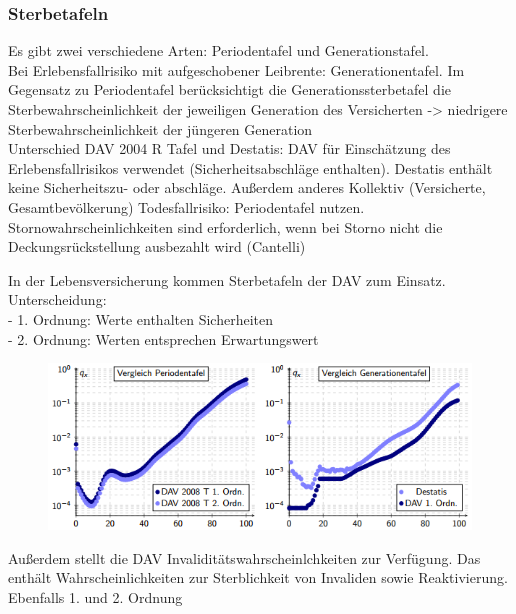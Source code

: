 \documentclass[12pt]{report}
\theoremstyle{dotless}
\theoremstyle{definition}
\begin{document}
\vspace{1cm}
\subsubsection{Sterbetafeln}
Es gibt zwei verschiedene Arten: Periodentafel und Generationstafel. \\
Bei Erlebensfallrisiko mit aufgeschobener Leibrente: Generationentafel. Im Gegensatz zu Periodentafel berücksichtigt die Generationssterbetafel die Sterbewahrscheinlichkeit der jeweiligen Generation des Versicherten -> niedrigere Sterbewahrscheinlichkeit der jüngeren Generation\\
Unterschied DAV 2004 R Tafel und Destatis: DAV für Einschätzung des Erlebensfallrisikos verwendet (Sicherheitsabschläge enthalten). Destatis enthält keine Sicherheitszu- oder abschläge. Außerdem anderes Kollektiv (Versicherte, Gesamtbevölkerung)
Todesfallrisiko: Periodentafel nutzen. Stornowahrscheinlichkeiten sind
erforderlich, wenn bei Storno nicht die Deckungsrückstellung ausbezahlt wird (Cantelli)

In der Lebensversicherung kommen Sterbetafeln der DAV zum Einsatz.\\
Unterscheidung: \\
- 1. Ordnung: Werte enthalten Sicherheiten\\
- 2. Ordnung: Werten entsprechen Erwartungswert

\begin{figure}[ht]
	\centering
	\includegraphics[scale=1]{Bilder/SterbetafelBsp2.png}
\end{figure}
Außerdem stellt die DAV Invaliditätswahrscheinlchkeiten zur Verfügung. Das enthält Wahrscheinlichkeiten zur Sterblichkeit von Invaliden sowie Reaktivierung. Ebenfalls 1. und 2. Ordnung
\end{document}

